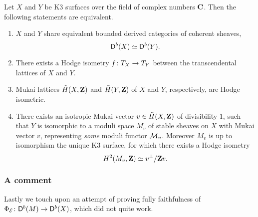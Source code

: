 \begin{theorem}
    \label{Derived torelli at the end}
    Let $X$ and $Y$ be K3 surfaces over the field of complex numbers $\mathbf C$. Then the following statements are equivalent.
    \begin{enumerate}[label = (\roman*)]
        \item{$X$ and $Y$ share equivalent bounded derived categories of coherent sheaves, 
        \[
            \mathsf{D}^b(X) \simeq \mathsf{D}^b(Y).
        \]
        }
        \item{There exists a Hodge isometry $f \colon T_{X} \to T_{Y}$ between the transcendental lattices of $X$ and $Y$.}
        \item{Mukai lattices $\,\tilde{\!{H}}(X, \mathbf Z)$ and $\,\tilde{\!{H}}(Y, \mathbf Z)$ of $X$ and $Y$, respectively, are Hodge isometric. 
        }
        \item{There exists 
        an isotropic Mukai vector $v \in \,\tilde{\!{H}}(X, \mathbf Z)$ of divisibility $1$,
        such that $Y$ is isomorphic to a moduli space $M_v$ of stable sheaves on $X$ with Mukai vector $v$, representing \emph{some} moduli functor $\mathcal M_v$. Moreover $M_v$ is up to isomorphism the unique K3 surface, for which there exists a Hodge isometry
        \[
            H^{2}(M_v, \mathbf Z) \simeq v^\perp / \mathbf Z v.
        \]
        }
    \end{enumerate}
\end{theorem}


\subsubsection*{A comment}

Lastly we touch upon an attempt of proving fully faithfulness of $\Phi_{\mathcal E} \colon \mathsf{D}^b(M) \to \mathsf{D}^b(X)$, which did not quite work.
